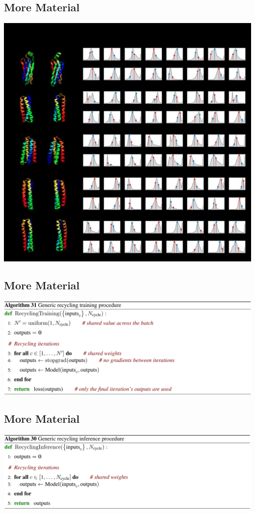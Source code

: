 \documentclass[presentation, smaller]{beamer}
\begin{document}
\subsection*{More Material}
\label{sec:orgebc93e6}
\begin{center}
\includegraphics[width=.9\linewidth]{./imgs/Examples-of-distograms-from-trRosetta.jpg}
\end{center}
\subsection*{More Material}
\label{sec:orgaadb192}
\begin{center}
\includegraphics[width=.9\linewidth]{./imgs/generic-recycling-algo31.png}
\end{center}
\subsection*{More Material}
\label{sec:orgb86f959}
\begin{center}
\includegraphics[width=.9\linewidth]{./imgs/recycling-algo30.png}
\end{center}
\end{document}
